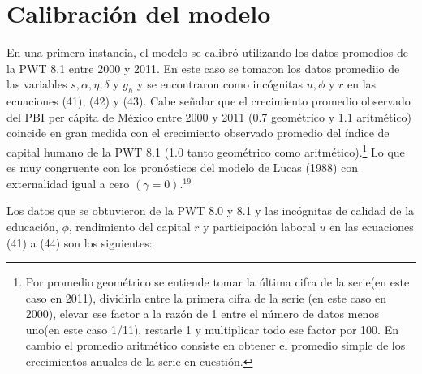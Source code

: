 \documentclass[12pt,notitlepage]{report}
\begin{document}
	\chapter{Calibración del modelo}
	\addtocounter{footnote}{17}
	En una primera instancia, el modelo se calibró utilizando los datos promedios de la PWT 8.1 entre 2000 y 2011. En este caso se tomaron los datos promediio de las variables $s, \alpha,\eta, \delta$ y $g_h$ y se encontraron como incógnitas $u, \phi$ y $r$ en las ecuaciones (41), (42) y (43). Cabe señalar que el crecimiento promedio observado del PBI per cápita de México entre 2000 y 2011 (0.7 geométrico y 1.1 aritmético) coincide en gran medida con el crecimiento observado promedio del índice de capital humano de la PWT 8.1 (1.0 tanto geométrico como aritmético).\footnote{Por promedio geométrico se entiende tomar la última cifra de la serie(en este caso en 2011), dividirla entre la primera cifra de la serie (en este caso en 2000), elevar ese factor a la razón de 1 entre el número de datos menos uno(en este caso 1/11), restarle 1 y multiplicar todo ese factor por 100. En cambio el promedio aritmético consiste en obtener el promedio simple de los crecimientos anuales de la serie en cuestión.} Lo que es muy congruente con los pronósticos del modelo de Lucas (1988) con externalidad igual a cero $(\gamma=0)$.$^{19}$
	
	Los datos que se obtuvieron de la PWT 8.0 y 8.1 y las incógnitas de calidad de la educación, $\phi$, rendimiento del capital $r$ y participación laboral $u$ en las ecuaciones (41) a (44) son los siguientes:
	\newpage
	
\end{document}
